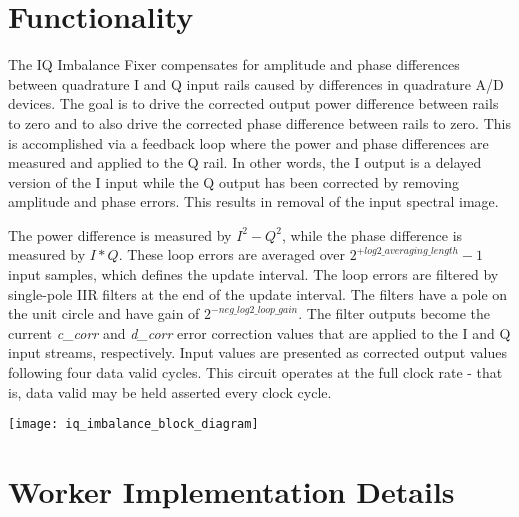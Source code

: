 \def\name{\comp}
\def\workertype{Application}
\def\version{\ocpiversion}
\def\releasedate{11/2019}
\def\componentlibrary{ocpi.assets.dsp\_{}comps}
\def\workers{\comp.hdl}
\def\testedplatforms{alst4, E310(PL), isim, Matchstiq-Z1(PL), ml605, modelsim, xsim, ZedBoard(PL)}


\section*{Functionality}
\begin{flushleft}
	The IQ Imbalance Fixer compensates for amplitude and phase differences between quadrature I and Q input rails caused by differences in quadrature A/D devices. The goal is to drive the corrected output power difference between rails to zero and to also drive the corrected phase difference between rails to zero. This is accomplished via a feedback loop where the power and phase differences are measured and applied to the Q rail. In other words, the I output is a delayed version of the I input while the Q output has been corrected by removing amplitude and phase errors. This results in removal of the input spectral image.\medskip

	The power difference is measured by $I^2 - Q^2$, while the phase difference is measured by $I*Q$. These loop errors are averaged over $2^{+log2\_averaging\_length}-1$ input samples, which defines the update interval. The loop errors are filtered by single-pole IIR filters at the end of the update interval. The filters have a pole on the unit circle and have gain of $2^{-neg\_log2\_loop\_gain}$. The filter outputs become the current \textit{c\_corr} and \textit{d\_corr} error correction values that are applied to the I and Q input streams, respectively. Input values are presented as corrected output values following four data valid cycles. This circuit operates at the full clock rate - that is, data valid may be held asserted every clock cycle.\medskip
\end{flushleft}

{\centering\captionsetup{type=figure}\texttt{[image: iq\_imbalance\_block\_diagram]}\par{}\label{fig:iq_imbalance_block_diagram}}
\newpage

\section*{Worker Implementation Details}
